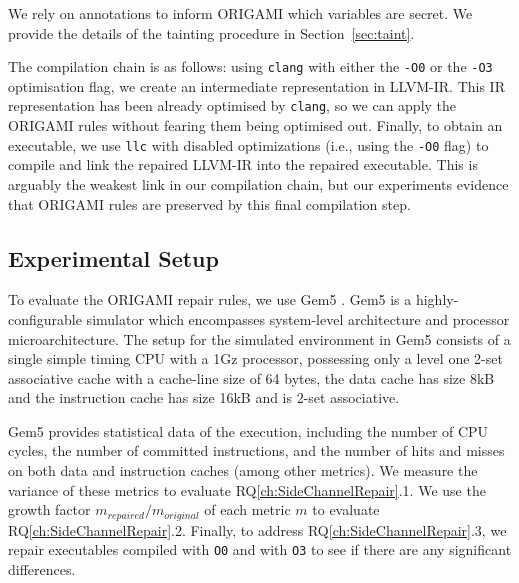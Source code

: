 We rely on annotations to inform ORIGAMI which variables are secret. We provide the details of the tainting procedure in Section~\ref{sec:taint}. 

The compilation chain is as follows: using \texttt{clang} with either the \texttt{-\texttt{O0}} or the \texttt{-\texttt{O3}} optimisation flag, we create an intermediate representation in LLVM-IR. This IR representation has been already optimised by \texttt{clang}, so we can apply the ORIGAMI rules without fearing them being optimised out. Finally, to obtain an executable, we use \texttt{llc} with disabled optimizations (i.e., using the \texttt{-\texttt{O0}} flag) to compile and link the repaired LLVM-IR into the repaired executable. This is arguably the weakest link in our compilation chain, but our experiments evidence that ORIGAMI rules are preserved by this final compilation step.

\subsection{Experimental Setup}
To evaluate the ORIGAMI repair rules, we use Gem5 \cite{gem5}. Gem5 is a highly-configurable simulator which encompasses system-level architecture and processor microarchitecture. The setup for the simulated environment in Gem5 consists of a single simple timing CPU with a 1Gz processor, possessing only a level one 2-set associative cache with a cache-line size of 64 bytes, the data cache has size 8kB and the instruction cache has size 16kB and is 2-set associative.

Gem5 provides statistical data of the execution, including the number of CPU cycles, the number of committed instructions, and the number of hits and misses on both data and instruction caches (among other metrics). We measure the variance of these metrics to evaluate RQ\ref{ch:SideChannelRepair}.1. We use the growth factor $m_{repaired}/m_{original}$ of each metric $m$ to evaluate RQ\ref{ch:SideChannelRepair}.2. Finally, to address RQ\ref{ch:SideChannelRepair}.3, we repair executables compiled with \texttt{O0} and with \texttt{O3} to see if there are any significant differences.

